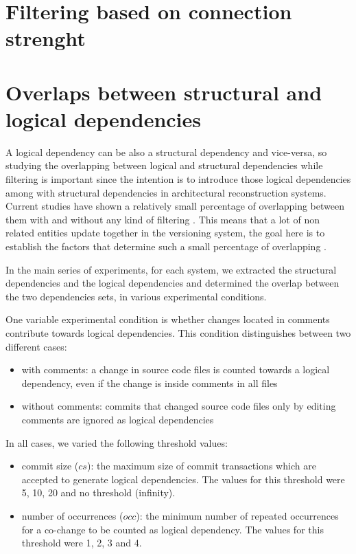 \documentclass[12pt]{mitthesis}
\begin{document}
\section{Filtering based on connection strenght}
\label{sec:filterstrength}





\section{Overlaps between structural and logical dependencies}
\label{sec:overlaps}
A logical dependency can be also a structural dependency and vice-versa, so studying the overlapping between logical and structural dependencies while filtering is important since the intention is to introduce those logical dependencies among with structural dependencies in architectural reconstruction systems. Current studies have shown a relatively small percentage of overlapping between them with and without any kind of filtering \cite{DBLP:journals/jss/AjienkaC17}. This means that a lot of non related entities update together in the versioning system, the goal here is to establish the factors that determine such a small percentage of overlapping \cite{enase19}.


In the main series of experiments, for each system, we extracted the structural dependencies and the logical dependencies and determined the overlap between the two dependencies sets, in various experimental conditions. 

One variable experimental condition is whether changes located in comments contribute towards logical dependencies. This condition distinguishes between two different cases: 
\begin{itemize}
	\item with comments: a change in source code files is counted towards a logical dependency, even if the change is inside comments in all files
	\item without comments: commits that changed source code files only by editing comments are ignored as logical dependencies
\end{itemize}

In all cases, we varied the following threshold values: 
 \begin{itemize}
	\item commit size ($cs$): the maximum size of commit transactions which are accepted to generate logical dependencies. The values for this threshold were 5, 10, 20 and no threshold (infinity).  
	\item number of occurrences ($occ$): the minimum number of repeated occurrences for a co-change to be counted as logical dependency. The values for this threshold were 1, 2, 3 and 4.  
\end{itemize}
\end{document}
